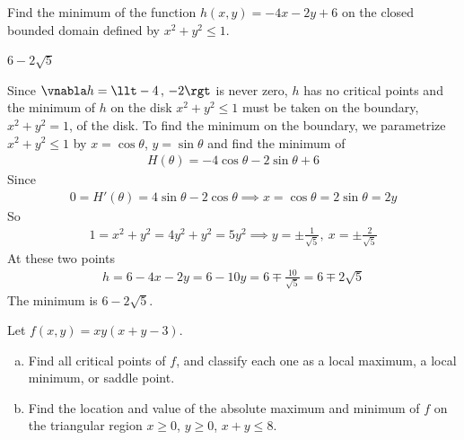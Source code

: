 \begin{question}[M200 2013D] %
Find the minimum of the function $h(x,y) = -4x - 2y + 6$ on the closed 
bounded domain defined by $x^2 + y^2 \le 1$.
\end{question}

%

\begin{answer}
$6-2\sqrt{5}$
\end{answer}

\begin{solution}
Since $\vnabla h = \llt -4\,,\,-2 \rgt$ is never zero,
$h$ has no critical points and the minimum of $h$ on the disk
$x^2+y^2\le 1$ must be taken on the boundary, $x^2+y^2=1$,  of the
disk. To find the minimum on the boundary, we parametrize $x^2+y^2\le 1$
by $x=\cos\theta$, $y=\sin\theta$ and find the minimum of
\begin{align*}
H(\theta) = -4\cos\theta -2\sin\theta +6
\end{align*}  
Since 
\begin{align*}
0=H'(\theta) = 4\sin\theta -2\cos\theta
\implies 
x=\cos\theta = 2\sin\theta =2y
\end{align*}
So
\begin{align*}
1=x^2+y^2 = 4y^2 +y^2 =5 y^2
\implies y = \pm\frac{1}{\sqrt{5}},\ 
         x = \pm\frac{2}{\sqrt{5}}
\end{align*}
At these two points
\begin{align*}
h = 6-4x-2y = 6 - 10y =6 \mp \frac{10}{\sqrt{5}} =6 \mp 2\sqrt{5}
\end{align*}
The minimum is $6-2\sqrt{5}$.
\end{solution}

\begin{question}[M200 2014D] %
Let $f(x,y) = xy(x + y - 3)$.
\begin{enumerate}[(a)]
\item
Find all critical points of $f$, and classify each one as a local maximum, 
a local minimum, or saddle point.
\item
Find the location and value of the absolute maximum and minimum of $f$ 
on the triangular region $x \ge 0$, $y \ge 0$, $x + y \le 8$.
\end{enumerate}
\end{question}

%

